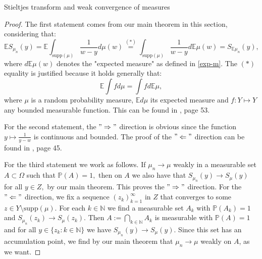 \documentclass[11pt, a4paper, oneside]{book}
\numberwithin{equation}{chapter}
\newcommand{\E}{\mathbb E}
\begin{document}
\begin{section}{Stieltjes transform and weak convergence of measures}
\begin{proof}
The first statement comes from our main theorem in this section, considering that:
\[
\mathbb{E} S_{\mu_n}(y) = \mathbb{E} \int_{\mathrm{supp}(\mu)}\frac{1}{w-y}d\mu(w) \overset{(*)}{=} \int_{\mathrm{supp}(\mu)}\frac{1}{w-y}d \mathbb{E} \mu(w) = S_{\E \mu_n}(y),
\]
where $d \mathbb{E} \mu(w)$ denotes the "expected measure" as defined in \ref{exp-m}. The $(*)$ equality is justified because it holds generally that:
\[
\E \int f d\mu = \int f d\E \mu,
\]
where $\mu$ is a random probability measure, $\E d \mu$ its expected measure and $f: Y \mapsto Y$ any bounded measurable function. This can be found in \cite{kallenberg2017random}, page 53.

For the second statement, the $"\Rightarrow"$ direction is obvious since the function $y \mapsto \frac{1}{y-w}$ is continuous and bounded. The proof of the $"\Leftarrow"$ direction can be found in 
\cite{anderson2010introduction}, page 45.

For the third statement we work as follows. If $\mu_n \to \mu$ weakly in a measurable set $A \subset \Omega$ such that $\mathbb{P}(A)=1,$ then on $A$ we also have that $S_{\mu_n}(y) \to S_{\mu}(y)$ for all $y \in Z,$ by our main theorem. This proves the $"\Rightarrow"$ direction. For the $"\Leftarrow"$ direction, we fix a sequence $(z_k)_{k=1}^\infty$ in $Z$ that converges to some $z \in Y \setminus \mathrm{supp}(\mu).$ For each $k \in \mathbb{N}$ we find a measurable set $A_k$ with $\mathbb{P}(A_k)=1$ and $S_{\mu_n}(z_k) \to S_{\mu}(z_k).$ Then $A:= \bigcap \limits_{k \in \mathbb{N}} A_k$ is measurable with $\mathbb{P}(A)=1$ and for all $y \in \{z_k : k \in \mathbb{N} \}$ we have $S_{\mu_n}(y) \to S_{\mu}(y).$ Since this set has an accumulation point, we find by our main theorem that $\mu_n \to \mu$ weakly on $A$, as we want.
\end{proof}

\end{section}
\end{document}
